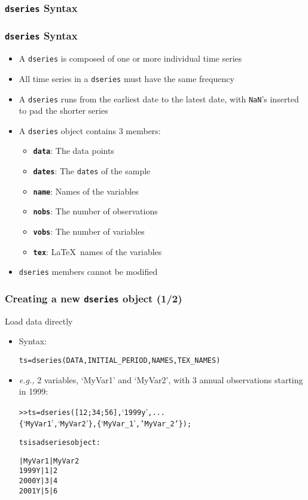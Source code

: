 \documentclass[10pt]{beamer}
\newcommand{\myitem}{\item[$\bullet$]}
\begin{document}
\subsubsection{\texttt{dseries} Syntax}
\begin{frame}[fragile,t]
  \frametitle{\texttt{dseries} Syntax}
  \begin{itemize}
    \myitem A \texttt{dseries} is composed of one or more individual time series
    \myitem All time series in a \texttt{dseries} must have the same frequency
    \myitem A \texttt{dseries} runs from the earliest date to the latest date,
    with \texttt{NaN}'s inserted to pad the shorter series
    \myitem A \texttt{dseries} object contains 3 members:
    \begin{itemize}
      \myitem{\textbf{\texttt{data}}}: The data points
      \myitem{\textbf{\texttt{dates}}}: The \texttt{dates} of the sample
      \myitem{\textbf{\texttt{name}}}: Names of the variables
      \myitem{\textbf{\texttt{nobs}}}: The number of observations
      \myitem{\textbf{\texttt{vobs}}}: The number of variables
      \myitem{\textbf{\texttt{tex}}}: \LaTeX\ names of the variables
    \end{itemize}
    \myitem \texttt{dseries} members cannot be modified
  \end{itemize}
\end{frame}


\begin{frame}[fragile,t]
  \frametitle{Creating a new \texttt{dseries} object (1/2)}
  Load data directly
  \begin{itemize}
    \myitem Syntax:
    \begin{alltt}
  ts = dseries(DATA, INITIAL_PERIOD, NAMES, TEX_NAMES)
    \end{alltt}
    \myitem \textit{e.g.,} 2 variables, `MyVar1' and `MyVar2', with
    3 annual observations starting in 1999:
\small{
    \begin{alltt}
  >> ts = dseries([1 2;3 4;5 6], `1999y', ...
                 \{`MyVar1', `MyVar2'\}, \{`MyVar\_1', 'MyVar\_2'\});

  ts is a dseries object:

        | MyVar1 | MyVar2
  1999Y | 1      | 2
  2000Y | 3      | 4
  2001Y | 5      | 6
    \end{alltt}}
  \end{itemize}
\end{frame}
\end{document}
